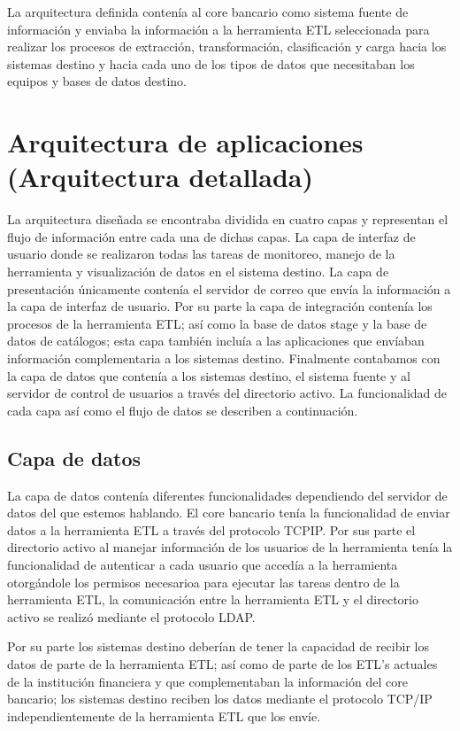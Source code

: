 \documentclass[a4paper,openright,12pt]{book}
\begin{document}
La arquitectura definida contenía al core bancario como sistema fuente de información y enviaba la información a la herramienta ETL seleccionada para realizar los procesos de extracción, transformación, clasificación y carga hacia los sistemas destino y hacia cada uno de los tipos de datos que necesitaban los equipos y bases de datos destino.


\section{Arquitectura de aplicaciones (Arquitectura detallada)}
La arquitectura diseñada se encontraba dividida en cuatro capas y representan el flujo de información entre cada una de dichas capas. La capa de interfaz de usuario donde se realizaron todas las tareas de monitoreo, manejo de la herramienta y visualización de datos en el sistema destino. La capa de presentación únicamente contenía el servidor de correo que envía la información a la capa de interfaz de usuario. Por su parte la capa de integración contenía los procesos de la herramienta ETL; así como la base de datos stage y la base de datos de catálogos; esta capa también incluía a las aplicaciones que envíaban información complementaria a los sistemas destino. Finalmente contabamos con la capa de datos que contenía a los sistemas destino, el sistema fuente y al servidor de control de usuarios a través del directorio activo. La funcionalidad de cada capa así como el flujo de datos se describen a continuación. 

\subsection{Capa de datos}
La capa de datos contenía diferentes funcionalidades dependiendo del servidor de datos del que estemos hablando. El core bancario tenía la funcionalidad de enviar datos a la herramienta ETL a través del protocolo TCP\/IP. Por sus parte el directorio activo al manejar información de los usuarios de la herramienta tenía la funcionalidad de autenticar a cada usuario que accedía a la herramienta otorgándole los permisos necesarioa para ejecutar las tareas dentro de la herramienta ETL, la comunicación entre la herramienta ETL y el directorio activo se realizó mediante el protocolo LDAP. 

Por su parte los sistemas destino deberían de tener la capacidad de recibir los datos de parte de la herramienta ETL; así como de parte de los ETL's actuales de la institución financiera y que complementaban la información del core bancario; los sistemas destino reciben los datos mediante el protocolo TCP/IP independientemente de la herramienta ETL que los envíe.
\end{document}
